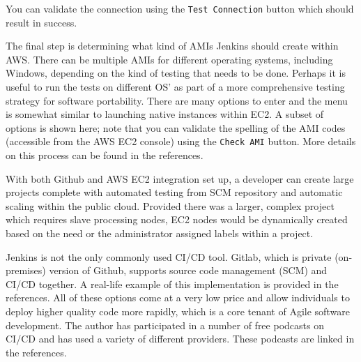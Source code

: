 
You can validate the connection using the \verb|Test Connection| button which
should result in success.


The final step is determining what kind of AMIs Jenkins should create within
AWS\@. There can be multiple AMIs for different operating systems, including
Windows, depending on the kind of testing that needs to be done. Perhaps it is
useful to run the tests on different OS' as part of a more comprehensive
testing strategy for software portability. There are many options to enter and
the menu is somewhat similar to launching native instances within EC2. A
subset of options is shown here; note that you can validate the spelling of
the AMI codes (accessible from the AWS EC2 console) using the \verb|Check AMI|
button. More details on this process can be found in the references.


With both Github and AWS EC2 integration set up, a developer can create large
projects complete with automated testing from SCM repository and automatic
scaling within the public cloud. Provided there was a larger, complex project
which requires slave processing nodes, EC2 nodes would be dynamically created
based on the need or the administrator assigned labels within a project.

Jenkins is not the only commonly used CI/CD tool. Gitlab, which is private
(on-premises) version of Github, supports source code management (SCM) and
CI/CD together. A real-life example of this implementation is provided in the
references. All of these options come at a very low price and allow
individuals to deploy higher quality code more rapidly, which is a core tenant
of Agile software development. The author has participated in a number of free
podcasts on CI/CD and has used a variety of different providers. These podcasts
are linked in the references.
